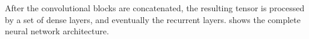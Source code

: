 
After the convolutional blocks are concatenated, the
resulting tensor is processed by a set of dense layers, and
eventually the recurrent layers.  shows the complete neural network
architecture.

